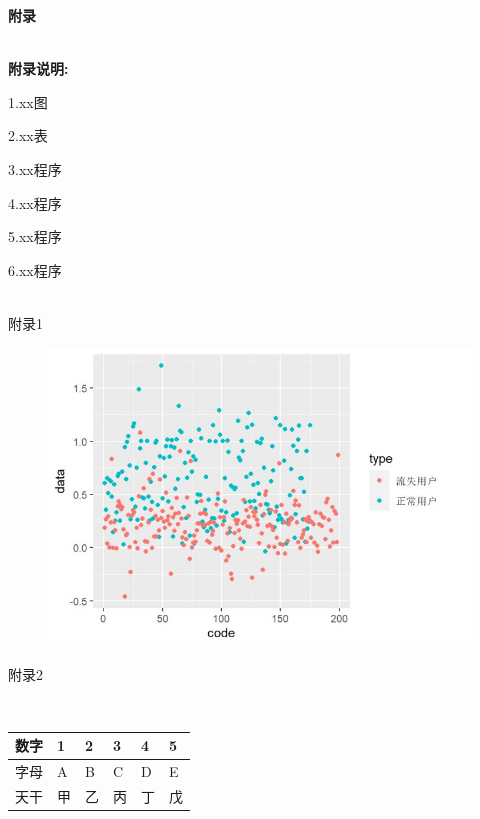 \documentclass{ctexart}
\begin{document}
\begin{flushleft}
    \Large{ \textbf{附录}}

    ~\\

    \normalsize \textbf{附录说明:}

    1.xx图

    2.xx表

    3.xx程序

    4.xx程序

    5.xx程序

    6.xx程序

    ~\\

    附录1

    \begin{center}
        \begin{figure}[H]
            \begin{center}
                \includegraphics[width=1.00\linewidth]{pic/样图.jpg}
            \end{center}
        \end{figure}
    \end{center}

    附录2
    
    ~\\

    \begin{tabularx}{\textwidth}{|c|X|X|X|X|X|}
        \hline
        数字 &1&2&3&4&5\\
        \hline 
        字母 &A&B&C&D&E\\
        \hline 
        天干 & 甲 & 乙 & 丙 & 丁 & 戊 \\
        \hline
    \end{tabularx}


\end{flushleft}
\end{document}
